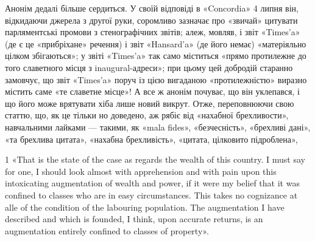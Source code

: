 Анонім дедалі більше сердиться. У своїй відповіді в «Concordia»
4 липня він, відкидаючи джерела з другої руки, соромливо
зазначає про «звичай» цитувати парляментські промови з стенографічних
звітів; алеж, мовляв, і звіт «Times’a» (де є це «прибріхане»
речення) і звіт «Hansard’a» (де його немає) «матеріяльно
цілком збігаються»; у звіті «Times’a» так само міститься «прямо
протилежне до того славетного місця з inaugural-адреси»; при
цьому цей добродій старанно замовчує, що звіт «Times’a» поруч
із цією вигаданою «протилежністю» виразно містить саме «те
славетне місце»! А все ж анонім почуває, що він уклепався, і що
його може врятувати хіба лише новий викрут. Отже, переповнюючи
свою статтю, що, як це тільки но доведено, аж рябіє від
«нахабної брехливости», навчальними лайками — такими, як
«mala fides», «безчесність», «брехливі дані», «та брехлива цитата»,
«нахабна брехливість», «цитата, цілковито підроблена»,

1 «That is the state of the case as regards the wealth of this country.
I must say for one, I should look almost with apprehension and with pain
upon this intoxicating augmentation of wealth and power, if it were my
belief that it was confined to classes who are in easy circumstances. This
takes no cognizance at alle of the condition of the labouring population.
The augmentation I have described and which is founded, I think, upon
accurate returns, is an augmentation entirely confined to classes of property».
\parbreak{}  %
